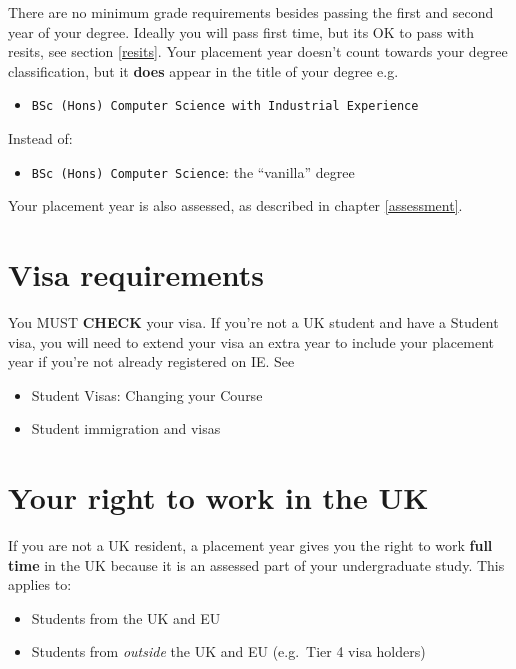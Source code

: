 \documentclass[
]{book}
\providecommand{\tightlist}{%
  \setlength{\itemsep}{0pt}\setlength{\parskip}{0pt}}
\begin{document}
There are no minimum grade requirements besides passing the first and second year of your degree. Ideally you will pass first time, but its OK to pass with resits, see section \ref{resits}. Your placement year doesn't count towards your degree classification, but it \textbf{does} appear in the title of your degree e.g.

\begin{itemize}
\tightlist
\item
  \texttt{BSc\ (Hons)\ Computer\ Science\ with\ Industrial\ Experience}
\end{itemize}

Instead of:

\begin{itemize}
\tightlist
\item
  \texttt{BSc\ (Hons)\ Computer\ Science}: the ``vanilla'' degree
\end{itemize}

Your placement year is also assessed, as described in chapter \ref{assessment}.

\section{Visa requirements}\label{visa-requirements}

You MUST \textbf{CHECK} your visa. If you're not a UK student and have a Student visa, you will need to extend your visa an extra year to include your placement year if you're not already registered on IE. See

\begin{itemize}
\tightlist
\item
  Student Visas: Changing your Course \citep{changing}
\item
  Student immigration and visas \citep{immigration}
\end{itemize}

\section{Your right to work in the UK}\label{uk}

If you are not a UK resident, a placement year gives you the right to work \textbf{full time} in the UK because it is an assessed part of your undergraduate study. \citep{righttowork, workingduringstudy} This applies to:

\begin{itemize}
\tightlist
\item
  Students from the UK and EU
\item
  Students from \emph{outside} the UK and EU (e.g.~Tier 4 visa holders)
\end{itemize}
\end{document}
